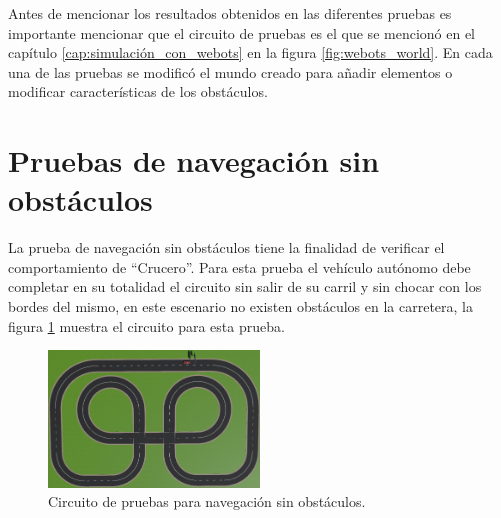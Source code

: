 Antes de mencionar los resultados obtenidos en las diferentes pruebas es importante mencionar que el circuito de pruebas es el que se mencionó en el capítulo \ref{cap:simulación_con_webots} en la figura \ref{fig:webots_world}. En cada una de las pruebas se modificó el mundo creado para añadir elementos o modificar características de los obstáculos.

\section{Pruebas de navegación sin obstáculos} \label{sec:pruebas_de_navegación_sin_obstáculos}

La prueba de navegación sin obstáculos tiene la finalidad de verificar el comportamiento de ``Crucero''. Para esta prueba el vehículo autónomo debe completar en su totalidad el circuito sin salir de su carril y sin chocar con los bordes del mismo, en este escenario no existen obstáculos en la carretera, la figura \ref{fig:navigation_no_obstacles} muestra el circuito para esta prueba.
\begin{figure}[h]
    \centering
    \includegraphics[width=0.5\textwidth]{Figures/Figures_Cap07/navigation_no_obstacles.png}
    \caption{Circuito de pruebas para navegación sin obstáculos.}
    \label{fig:navigation_no_obstacles}
\end{figure}

